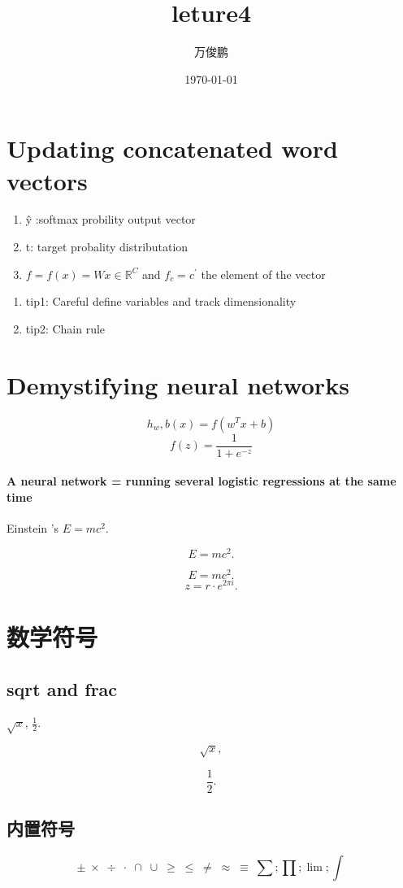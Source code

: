 \documentclass[UTF8]{ctexart}
\title{leture4}
\author{万俊鹏}
\date{\today}
\begin{document}
\tableofcontents
\maketitle
\section{Updating concatenated word vectors}
\begin{enumerate}
\item  \^{y} :softmax probility output vector
\item  t: target probality distributation
\item $ f = f(x) = Wx\in \mathbb{R}^C $ and $f_c = c^'$  the element of the vector
\end{enumerate}


\begin{enumerate}
\item tip1: Careful define variables  and track dimensionality
\item tip2: Chain rule
\end{enumerate}

\section{Demystifying neural networks}
\[  h_w,b (x) = f(w^Tx +b) \]
\[ f(z) = \frac{1}{1+e^{-z}}\]

\paragraph{A neural network = running several logistic regressions at the same time}


Einstein 's $E=mc^2$.

\[ E=mc^2. \]

\begin{equation}
E=mc^2.
\end{equation}
\[ z = r\cdot e^{2\pi i}. \]

\section{数学符号}
\subsection{sqrt and frac}
$\sqrt{x}$, $\frac{1}{2}$.

\[ \sqrt{x}, \]

\[ \frac{1}{2}. \]
\subsection{内置符号}
\[ \pm\; \times \; \div\; \cdot\; \cap\; \cup\;
\geq\; \leq\; \neq\; \approx \; \equiv \;\sum;\prod; \lim;\int \]
\end{document}
